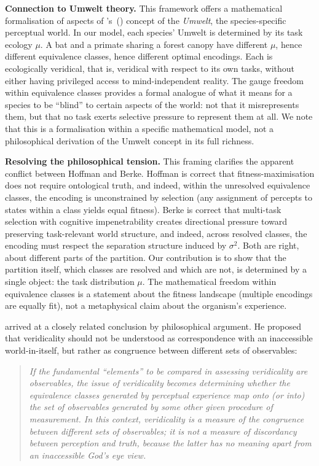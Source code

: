 \documentclass[12pt]{article}
\newcommand{\sigmasq}{\sigma^2}
\begin{document}
\textbf{Connection to Umwelt theory.} This framework offers a mathematical formalisation of aspects of \citeauthor{vonuexkull_1934}'s~(\citeyear{vonuexkull_1934}) concept of the \emph{Umwelt}, the species-specific perceptual world. In our model, each species' Umwelt is determined by its task ecology $\mu$. A bat and a primate sharing a forest canopy have different $\mu$, hence different equivalence classes, hence different optimal encodings. Each is ecologically veridical, that is, veridical with respect to its own tasks, without either having privileged access to mind-independent reality. The gauge freedom within equivalence classes provides a formal analogue of what it means for a species to be ``blind'' to certain aspects of the world: not that it misrepresents them, but that no task exerts selective pressure to represent them at all. We note that this is a formalisation within a specific mathematical model, not a philosophical derivation of the Umwelt concept in its full richness.

\textbf{Resolving the philosophical tension.} This framing clarifies the apparent conflict between Hoffman and Berke. Hoffman is correct that fitness-maximisation does not require ontological truth, and indeed, within the unresolved equivalence classes, the encoding is unconstrained by selection (any assignment of percepts to states within a class yields equal fitness). Berke is correct that multi-task selection with cognitive impenetrability creates directional pressure toward preserving task-relevant world structure, and indeed, across resolved classes, the encoding must respect the separation structure induced by $\sigmasq$. Both are right, about different parts of the partition. Our contribution is to show that the partition itself, which classes are resolved and which are not, is determined by a single object: the task distribution $\mu$. The mathematical freedom within equivalence classes is a statement about the fitness landscape (multiple encodings are equally fit), not a metaphysical claim about the organism's experience.

\citet[p.~1509]{anderson_2015} arrived at a closely related conclusion by philosophical argument. He proposed that veridicality should not be understood as correspondence with an inaccessible world-in-itself, but rather as congruence between different sets of observables:

\begin{quote}\itshape
If the fundamental ``elements'' to be compared in assessing veridicality are observables, the issue of veridicality becomes determining whether the equivalence classes generated by perceptual experience map onto (or into) the set of observables generated by some other given procedure of measurement. In this context, veridicality is a measure of the congruence between different sets of observables; it is not a measure of discordancy between perception and truth, because the latter has no meaning apart from an inaccessible God's eye view.
\end{quote}
\end{document}
